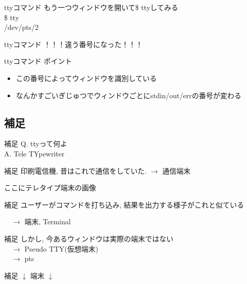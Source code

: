 \documentclass[uplatex, dvipdfmx, unicode]{beamer}
\begin{document}
\begin{frame}{ttyコマンド}
  もう一つウィンドウを開いて\$ ttyしてみる\\
  \vspace{0.2in}
  \$ tty \\
  /dev/pts/2
\end{frame}

\begin{frame}{ttyコマンド}
  \centering
  \alert{\Huge{！！！違う番号になった！！！}}
\end{frame}

\begin{frame}{ttyコマンド}
  ポイント
  \begin{itemize}
    \item{この番号によってウィンドウを識別している}
    \item{なんかすごいぎじゅつでウィンドウごとにstdin/out/errの番号が変わる}
  \end{itemize}
\end{frame}

\subsection{補足}
\begin{frame}{補足}
  Q. ttyって何よ \\
  A. \alert{T}ele \alert{TY}pewriter
\end{frame}

\begin{frame}{補足}
  印刷電信機, 昔はこれで通信をしていた. $\rightarrow$ 通信端末

  \centering
  ここにテレタイプ端末の画像
\end{frame}

\begin{frame}{補足}
  ユーザーがコマンドを打ち込み, 結果を出力する様子がこれと似ている

  \ \ $\rightarrow$ 端末, Terminal
\end{frame}

\begin{frame}{補足}
  しかし, 今あるウィンドウは実際の端末ではない\\
  \ \ $\rightarrow$ Pseudo TTY(仮想端末) \\
  \ \ $\rightarrow$ pts
\end{frame}

\begin{frame}{補足}
  \centering
  \Huge
  $\downarrow$ 端末 $\downarrow$
\end{frame}
\end{document}
